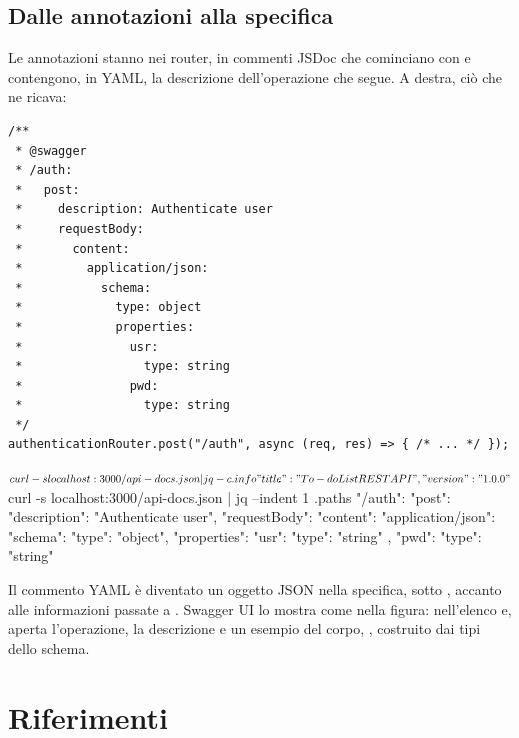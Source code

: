 \subsection{Dalle annotazioni alla specifica}

Le annotazioni stanno nei router, in commenti JSDoc che cominciano con
 e contengono, in YAML, la descrizione dell'operazione che
segue. A destra, ciò che  ne ricava:

\begin{affianco}[0.55][c]
\codicepiccolo
\begin{lstlisting}[style=js, name=routes/authenticationRouter.js]
/**
 * @swagger
 * /auth:
 *   post:
 *     description: Authenticate user
 *     requestBody:
 *       content:
 *         application/json:
 *           schema:
 *             type: object
 *             properties:
 *               usr:
 *                 type: string
 *               pwd:
 *                 type: string
 */
authenticationRouter.post("/auth", async (req, res) => { /* ... */ });
\end{lstlisting}
\risultato
\begin{console}[Terminale]
$ curl -s localhost:3000/api-docs.json | jq -c .info
{"title":"To-do List REST API","version":"1.0.0"}
$ curl -s localhost:3000/api-docs.json | jq --indent 1 .paths
{
 "/auth": {
  "post": {
   "description": "Authenticate user",
   "requestBody": {
    "content": {
     "application/json": {
      "schema": {
       "type": "object",
       "properties": {
        "usr": {
         "type": "string"
        },
        "pwd": {
         "type": "string"
        }
       }
      }
     }
    }
   }
  }
 }
}
\end{console}
\end{affianco}

Il commento YAML è diventato un oggetto JSON nella specifica, sotto
, accanto alle informazioni passate a . Swagger UI
lo mostra come nella figura:  nell'elenco e, aperta
l'operazione, la descrizione e un esempio del corpo,
, costruito dai tipi dello schema.

\section{Riferimenti}

